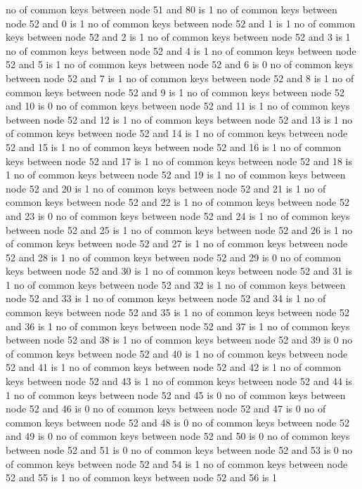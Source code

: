 no of common keys between node 51 and 80 is 1
no of common keys between node 52 and 0 is 1
no of common keys between node 52 and 1 is 1
no of common keys between node 52 and 2 is 1
no of common keys between node 52 and 3 is 1
no of common keys between node 52 and 4 is 1
no of common keys between node 52 and 5 is 1
no of common keys between node 52 and 6 is 0
no of common keys between node 52 and 7 is 1
no of common keys between node 52 and 8 is 1
no of common keys between node 52 and 9 is 1
no of common keys between node 52 and 10 is 0
no of common keys between node 52 and 11 is 1
no of common keys between node 52 and 12 is 1
no of common keys between node 52 and 13 is 1
no of common keys between node 52 and 14 is 1
no of common keys between node 52 and 15 is 1
no of common keys between node 52 and 16 is 1
no of common keys between node 52 and 17 is 1
no of common keys between node 52 and 18 is 1
no of common keys between node 52 and 19 is 1
no of common keys between node 52 and 20 is 1
no of common keys between node 52 and 21 is 1
no of common keys between node 52 and 22 is 1
no of common keys between node 52 and 23 is 0
no of common keys between node 52 and 24 is 1
no of common keys between node 52 and 25 is 1
no of common keys between node 52 and 26 is 1
no of common keys between node 52 and 27 is 1
no of common keys between node 52 and 28 is 1
no of common keys between node 52 and 29 is 0
no of common keys between node 52 and 30 is 1
no of common keys between node 52 and 31 is 1
no of common keys between node 52 and 32 is 1
no of common keys between node 52 and 33 is 1
no of common keys between node 52 and 34 is 1
no of common keys between node 52 and 35 is 1
no of common keys between node 52 and 36 is 1
no of common keys between node 52 and 37 is 1
no of common keys between node 52 and 38 is 1
no of common keys between node 52 and 39 is 0
no of common keys between node 52 and 40 is 1
no of common keys between node 52 and 41 is 1
no of common keys between node 52 and 42 is 1
no of common keys between node 52 and 43 is 1
no of common keys between node 52 and 44 is 1
no of common keys between node 52 and 45 is 0
no of common keys between node 52 and 46 is 0
no of common keys between node 52 and 47 is 0
no of common keys between node 52 and 48 is 0
no of common keys between node 52 and 49 is 0
no of common keys between node 52 and 50 is 0
no of common keys between node 52 and 51 is 0
no of common keys between node 52 and 53 is 0
no of common keys between node 52 and 54 is 1
no of common keys between node 52 and 55 is 1
no of common keys between node 52 and 56 is 1
